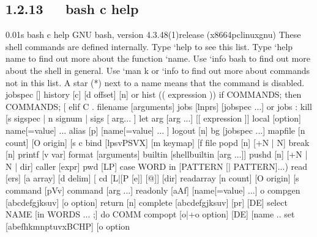 \documentclass[letterpaper,12pt,english]{sphinxmanual}
\begin{document}
\subsection{1.2.13   bash \sphinxhyphen{}c help}
\label{\detokenize{001software/001install/linux:bash-c-help}}
\begin{sphinxVerbatim}[commandchars=\\\{\}]
0.01s\PYGZdl{} bash \PYGZhy{}c help
GNU bash, version 4.3.48(1)\PYGZhy{}release (x86\PYGZus{}64\PYGZhy{}pc\PYGZhy{}linux\PYGZhy{}gnu)
These shell commands are defined internally.  Type `help\PYGZsq{} to see this list.
Type `help name\PYGZsq{} to find out more about the function `name\PYGZsq{}.
Use `info bash\PYGZsq{} to find out more about the shell in general.
Use `man \PYGZhy{}k\PYGZsq{} or `info\PYGZsq{} to find out more about commands not in this list.
A star (*) next to a name means that the command is disabled.
 job\PYGZus{}spec [\PYGZam{}]                            history [\PYGZhy{}c] [\PYGZhy{}d offset] [n] or hist\PYGZgt{}
 (( expression ))                        if COMMANDS; then COMMANDS; [ elif C\PYGZgt{}
 . filename [arguments]                  jobs [\PYGZhy{}lnprs] [jobspec ...] or jobs \PYGZgt{}
 :                                       kill [\PYGZhy{}s sigspec | \PYGZhy{}n signum | \PYGZhy{}sigs\PYGZgt{}
 [ arg... ]                              let arg [arg ...]
 [[ expression ]]                        local [option] name[=value] ...
 alias [\PYGZhy{}p] [name[=value] ... ]          logout [n]
 bg [job\PYGZus{}spec ...]                       mapfile [\PYGZhy{}n count] [\PYGZhy{}O origin] [\PYGZhy{}s c\PYGZgt{}
 bind [\PYGZhy{}lpsvPSVX] [\PYGZhy{}m keymap] [\PYGZhy{}f file\PYGZgt{}  popd [\PYGZhy{}n] [+N | \PYGZhy{}N]
 break [n]                               printf [\PYGZhy{}v var] format [arguments]
 builtin [shell\PYGZhy{}builtin [arg ...]]       pushd [\PYGZhy{}n] [+N | \PYGZhy{}N | dir]
 caller [expr]                           pwd [\PYGZhy{}LP]
 case WORD in [PATTERN [| PATTERN]...)\PYGZgt{}  read [\PYGZhy{}ers] [\PYGZhy{}a array] [\PYGZhy{}d delim] [\PYGZhy{}\PYGZgt{}
 cd [\PYGZhy{}L|[\PYGZhy{}P [\PYGZhy{}e]] [\PYGZhy{}@]] [dir]            readarray [\PYGZhy{}n count] [\PYGZhy{}O origin] [\PYGZhy{}s\PYGZgt{}
 command [\PYGZhy{}pVv] command [arg ...]        readonly [\PYGZhy{}aAf] [name[=value] ...] o\PYGZgt{}
 compgen [\PYGZhy{}abcdefgjksuv] [\PYGZhy{}o option]  \PYGZgt{}  return [n]
 complete [\PYGZhy{}abcdefgjksuv] [\PYGZhy{}pr] [\PYGZhy{}DE] \PYGZgt{}  select NAME [in WORDS ... ;] do COMM\PYGZgt{}
 compopt [\PYGZhy{}o|+o option] [\PYGZhy{}DE] [name ..\PYGZgt{}  set [\PYGZhy{}abefhkmnptuvxBCHP] [\PYGZhy{}o option\PYGZhy{}\PYGZgt{}

\end{sphinxVerbatim}
\end{document}
